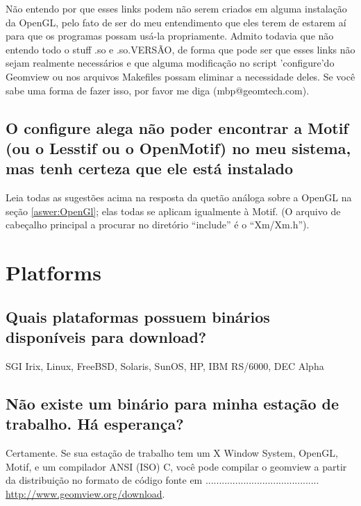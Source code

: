 \documentclass[12pt,a4paper]{article}
\begin{document}
\begin{itemize}
            N\~ao entendo por que esses links podem n\~ao serem criados em alguma
            instala\c{c}\~ao da OpenGL, pelo fato de ser do meu entendimento que eles
            terem de estarem a\'i para que os programas possam us\'a-la propriamente. Admito todavia que
            n\~ao entendo todo o stuff .so e .so.VERS\~AO, de forma que pode ser
            que esses links n\~ao sejam realmente necess\'arios e que alguma modifica\c{c}\~ao no
            script 'configure'do Geomview ou nos arquivos Makefiles possam eliminar a necessidade
            deles. Se voc\^e sabe uma forma de fazer isso, por favor me diga
            (mbp@geomtech.com).
     \end{itemize}

    \subsection{O configure alega n\~ao poder encontrar a Motif (ou o Lesstif ou o OpenMotif) no meu sistema, mas tenh certeza que ele est\'a instalado}

        Leia todas as sugest\~oes acima na resposta da quet\~ao an\'aloga
        sobre a OpenGL na se\c{c}\~ao \ref{aswer:OpenGl}; elas todas se aplicam igualmente \`a
        Motif. (O arquivo de cabe\c{c}alho principal a procurar no diret\'{o}rio ``include'' \'e o
        ``Xm/Xm.h'').

\section{Platforms}

    \subsection{Quais plataformas possuem bin\'arios dispon\'iveis para download?}

        SGI Irix, Linux, FreeBSD, Solaris, SunOS, HP, IBM RS/6000, DEC Alpha

    \subsection{N\~ao existe um bin\'ario para minha esta\c{c}\~ao de trabalho. H\'a esperan\c{c}a?}

        Certamente. Se sua esta\c{c}\~ao de trabalho tem um X Window System, OpenGL, Motif,
        e um compilador ANSI (ISO) C, voc\^e pode compilar o geomview a partir da distribui\c{c}\~ao no
        formato de c\'{o}digo fonte em ..........................................\\
        \url{http://www.geomview.org/download}.
\end{document}

